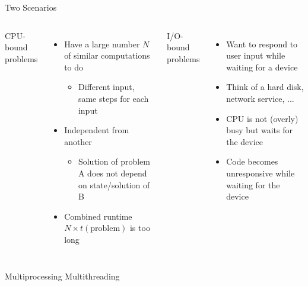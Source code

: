 \begin{frame}{Two Scenarios}
%
\begin{columns}[T]
CPU-bound problems
\begin{itemize}
\item Have a large number $N$ of similar computations to do
	\begin{itemize}
	\item Different input, same steps for each input
	\end{itemize}
\item Independent from another
	\begin{itemize}
	\item Solution of problem A does not depend on state/solution of B
	\end{itemize}
\item Combined runtime $N \times t(\text{problem})$ is too long
\end{itemize}
%
I/O-bound problems
\begin{itemize}
\item Want to respond to user input while waiting for a device
\item Think of a hard disk, network service, ...
\item CPU is not (overly) busy but waits for the device
\item Code becomes unresponsive while waiting for the device
\end{itemize}
\end{columns}

\vspace{12pt}
\begin{columns}[T]
\Thus Multiprocessing
%
\Thus Multithreading
\end{columns}
%
\end{frame}


